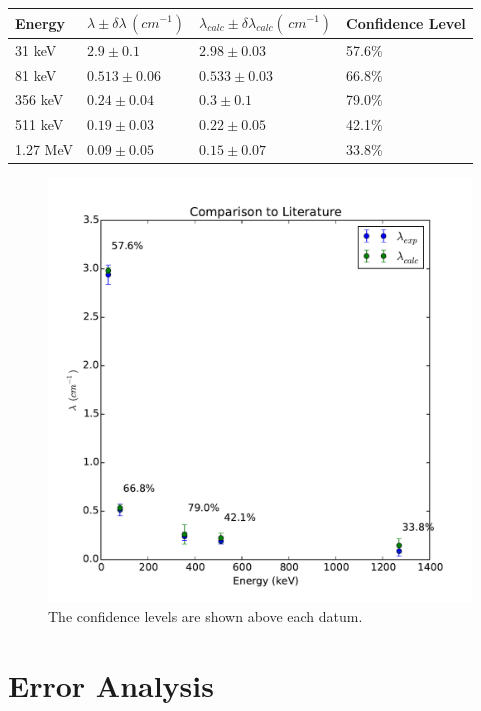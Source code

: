 \documentclass{article}
\newenvironment{tightcenter}{%
  \setlength\topsep{0pt}
  \setlength\parskip{0pt}
  \begin{center}
}{%
  \end{center}
}
\begin{document}
	\begin{center}
	\begin{tabular}{|l|l|l|l|}
		\hline
		Energy & $\lambda \pm \delta \lambda  \, (cm^{-1})$ & $\lambda_{calc} \pm \delta\lambda_{calc}  (\, cm^{-1})$ & Confidence Level\\ \hline \hline
		31 keV & $2.9 \pm 0.1$ & $2.98 \pm 0.03$ & 57.6\%\\
		81 keV & $0.513 \pm 0.06$ & $0.533 \pm 0.03$ & 66.8\%\\
		356 keV & $0.24 \pm 0.04$ & $0.3 \pm 0.1$ & 79.0\%\\
		511 keV & $0.19 \pm 0.03$ & $0.22 \pm 0.05$ & 42.1\%\\
		1.27 MeV & $0.09 \pm 0.05$ & $0.15 \pm 0.07$ & 33.8\%\\
		\hline
	\end{tabular}
	\end{center}

	\begin{tightcenter}
	\begin{figure}[!htb]
		\centering
		\includegraphics[scale=.5]{../plots/confidence}
		\caption{The confidence levels are shown above each datum.}
	\end{figure}
	\end{tightcenter}

\section{Error Analysis}
\end{document}
